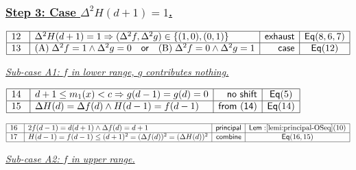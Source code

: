 \documentclass[11pt,reqno]{amsart}
\begin{document}
\subsubsection*{\protect\underline{Step 3: Case $\Delta ^{2}H(d+1)=1$.}}

\noindent$%
\begin{array}{|m{0.5cm}|l|r|c|}
\hline
12 & \Delta^{2}H(d+1)=1\Rightarrow(\Delta^{2}f,\Delta^{2}g)\in\{(1,0),(0,1)\}
& \mathsf{exhaust} & \mathsf{Eq}(8,6,7) \\ \hline
13 & \text{(A)}\;\Delta^{2}f=1\wedge\Delta^{2}g=0\quad\mathsf{or}\quad\text{%
(B)}\;\Delta^{2}f=0\wedge\Delta^{2}g=1 & \mathsf{case} & \mathsf{Eq}(12) \\ 
\hline
\end{array}%
$

\noindent 

\bigskip 
\medskip%

\underline{\textit{Sub-case A1: $f$ in lower range, $g$ contributes nothing.}%
}

\medskip%

\nointerlineskip \noindent $%
\begin{array}{|m{0.5cm}|l|r|c|}
\hline
14 & d+1\leq m_{1}(x)<c\Rightarrow g(d-1)=g(d)=0 & \mathsf{no\ shift} & 
\mathsf{Eq}(5) \\ \hline
15 & \Delta H(d)=\Delta f(d)\wedge H(d-1)=f(d-1) & \mathsf{from\ (14)} & 
\mathsf{Eq}(14) \\ \hline
\end{array}%
$

\nointerlineskip\noindent $%
\begin{array}{|m{0.5cm}|l|r|c|}
\hline
16 & 2f(d-1)=d(d+1)\wedge \Delta f(d)=d+1 & \mathsf{principal} & \mathsf{Lem:%
}\ref{lemi:principal-OSeq}(10) \\ \hline
17 & H(d-1)=f(d-1)\leq (d+1)^{2}=(\Delta f(d))^{2}=(\Delta H(d))^{2} & 
\mathsf{combine} & \mathsf{Eq}(16,15) \\ \hline
\end{array}%
$

\medskip%

\noindent \underline{\textit{Sub-case A2: $f$ in upper range.}}

\medskip%
\end{document}
